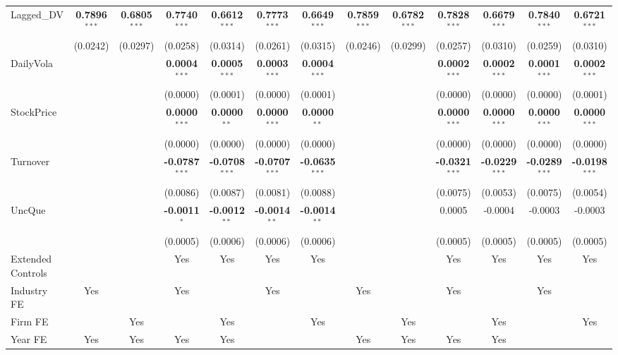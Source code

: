 \documentclass[11pt,a4paper]{article}
\begin{document}
\begin{table}[htbp]
\begin{tabular}{lcccccccccccc}
Lagged\_DV & \textbf{0.7896}$^{***}$ & \textbf{0.6805}$^{***}$ & \textbf{0.7740}$^{***}$ & \textbf{0.6612}$^{***}$ & \textbf{0.7773}$^{***}$ & \textbf{0.6649}$^{***}$ & \textbf{0.7859}$^{***}$ & \textbf{0.6782}$^{***}$ & \textbf{0.7828}$^{***}$ & \textbf{0.6679}$^{***}$ & \textbf{0.7840}$^{***}$ & \textbf{0.6721}$^{***}$ \\
 & (0.0242) & (0.0297) & (0.0258) & (0.0314) & (0.0261) & (0.0315) & (0.0246) & (0.0299) & (0.0257) & (0.0310) & (0.0259) & (0.0310) \\
DailyVola &  &  & \textbf{0.0004}$^{***}$ & \textbf{0.0005}$^{***}$ & \textbf{0.0003}$^{***}$ & \textbf{0.0004}$^{***}$ &  &  & \textbf{0.0002}$^{***}$ & \textbf{0.0002}$^{***}$ & \textbf{0.0001}$^{***}$ & \textbf{0.0002}$^{***}$ \\
 &  &  & (0.0000) & (0.0001) & (0.0000) & (0.0001) &  &  & (0.0000) & (0.0000) & (0.0000) & (0.0001) \\
StockPrice &  &  & \textbf{0.0000}$^{***}$ & \textbf{0.0000}$^{**}$ & \textbf{0.0000}$^{***}$ & \textbf{0.0000}$^{**}$ &  &  & \textbf{0.0000}$^{***}$ & \textbf{0.0000}$^{***}$ & \textbf{0.0000}$^{***}$ & \textbf{0.0000}$^{***}$ \\
 &  &  & (0.0000) & (0.0000) & (0.0000) & (0.0000) &  &  & (0.0000) & (0.0000) & (0.0000) & (0.0000) \\
Turnover &  &  & \textbf{-0.0787}$^{***}$ & \textbf{-0.0708}$^{***}$ & \textbf{-0.0707}$^{***}$ & \textbf{-0.0635}$^{***}$ &  &  & \textbf{-0.0321}$^{***}$ & \textbf{-0.0229}$^{***}$ & \textbf{-0.0289}$^{***}$ & \textbf{-0.0198}$^{***}$ \\
 &  &  & (0.0086) & (0.0087) & (0.0081) & (0.0088) &  &  & (0.0075) & (0.0053) & (0.0075) & (0.0054) \\
UncQue &  &  & \textbf{-0.0011}$^{*}$ & \textbf{-0.0012}$^{**}$ & \textbf{-0.0014}$^{**}$ & \textbf{-0.0014}$^{**}$ &  &  & 0.0005 & -0.0004 & -0.0003 & -0.0003 \\
 &  &  & (0.0005) & (0.0006) & (0.0006) & (0.0006) &  &  & (0.0005) & (0.0005) & (0.0005) & (0.0005) \\
\midrule
Extended Controls &  &  & Yes & Yes & Yes & Yes &  &  & Yes & Yes & Yes & Yes \\
Industry FE & Yes &  & Yes &  & Yes &  & Yes &  & Yes &  & Yes &  \\
Firm FE &  & Yes &  & Yes &  & Yes &  & Yes &  & Yes &  & Yes \\
Year FE & Yes & Yes & Yes & Yes &  &  & Yes & Yes & Yes & Yes &  &  \\

\end{tabular}
\end{table}
\end{document}
